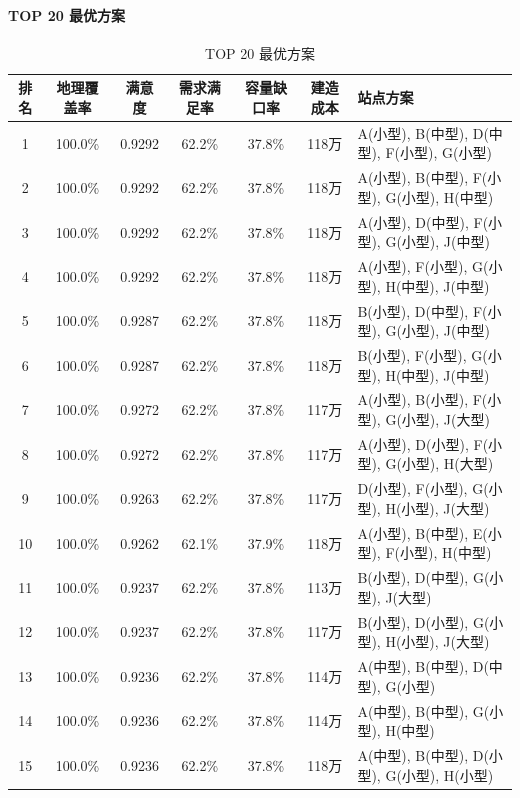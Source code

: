 \documentclass[UTF8]{ctexart}
\begin{document}
\paragraph{TOP 20 最优方案}

\begin{table}[H]
\centering
\caption{TOP 20 最优方案}
\renewcommand{\arraystretch}{1.3}
{\small
\begin{tabular}{|c|c|c|c|c|c|l|}
\hline
\textbf{排名} & \textbf{地理覆盖率} & \textbf{满意度} & \textbf{需求满足率} & \textbf{容量缺口率} & \textbf{建造成本} & \textbf{站点方案} \\
\hline
1 & 100.0\% & 0.9292 & 62.2\% & 37.8\% & 118万 & A(小型), B(中型), D(中型), F(小型), G(小型) \\
2 & 100.0\% & 0.9292 & 62.2\% & 37.8\% & 118万 & A(小型), B(中型), F(小型), G(小型), H(中型) \\
3 & 100.0\% & 0.9292 & 62.2\% & 37.8\% & 118万 & A(小型), D(中型), F(小型), G(小型), J(中型) \\
4 & 100.0\% & 0.9292 & 62.2\% & 37.8\% & 118万 & A(小型), F(小型), G(小型), H(中型), J(中型) \\
5 & 100.0\% & 0.9287 & 62.2\% & 37.8\% & 118万 & B(小型), D(中型), F(小型), G(小型), J(中型) \\
6 & 100.0\% & 0.9287 & 62.2\% & 37.8\% & 118万 & B(小型), F(小型), G(小型), H(中型), J(中型) \\
7 & 100.0\% & 0.9272 & 62.2\% & 37.8\% & 117万 & A(小型), B(小型), F(小型), G(小型), J(大型) \\
8 & 100.0\% & 0.9272 & 62.2\% & 37.8\% & 117万 & A(小型), D(小型), F(小型), G(小型), H(大型) \\
9 & 100.0\% & 0.9263 & 62.2\% & 37.8\% & 117万 & D(小型), F(小型), G(小型), H(小型), J(大型) \\
10 & 100.0\% & 0.9262 & 62.1\% & 37.9\% & 118万 & A(小型), B(中型), E(小型), F(小型), H(中型) \\
11 & 100.0\% & 0.9237 & 62.2\% & 37.8\% & 113万 & B(小型), D(中型), G(小型), J(大型) \\
12 & 100.0\% & 0.9237 & 62.2\% & 37.8\% & 117万 & B(小型), D(小型), G(小型), H(小型), J(大型) \\
13 & 100.0\% & 0.9236 & 62.2\% & 37.8\% & 114万 & A(中型), B(中型), D(中型), G(小型) \\
14 & 100.0\% & 0.9236 & 62.2\% & 37.8\% & 114万 & A(中型), B(中型), G(小型), H(中型) \\
15 & 100.0\% & 0.9236 & 62.2\% & 37.8\% & 118万 & A(中型), B(中型), D(小型), G(小型), H(小型) \\

\end{tabular}}
\end{table}
\end{document}
